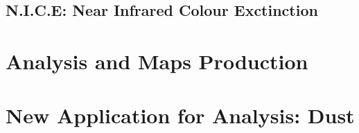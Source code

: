 \documentclass[a4paper,11pt,twoside]{book}
\begin{document}
\section{N.I.C.E: Near Infrared Colour Exctinction}




\chapter{Analysis and Maps Production}



\chapter{New Application for Analysis: Dust}





\backmatter
{}

\printbibliography
\end{document}
